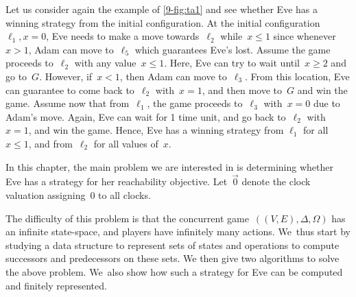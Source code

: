 \begin{example}
Let us consider again the example of \cref{9-fig:ta1} and see whether Eve
has a winning strategy from the initial configuration.
At the initial configuration~$\ell_1,x=0$, Eve needs to make a move towards~$\ell_2$
while~$x\leq 1$ since whenever~$x>1$, Adam can move to~$\ell_5$ which guarantees Eve's lost.
Assume the game proceeds to~$\ell_2$ with any value~$x\leq 1$. Here, Eve can try to wait
until~$x\geq 2$ and go to~$G$. However, if~$x<1$, then Adam can move to~$\ell_3$.
From this location, Eve can guarantee to come back to~$\ell_2$ with~$x=1$, and then move to~$G$ and win the game.
Assume now that from~$\ell_1$, the game proceeds to~$\ell_3$ with~$x=0$ due to Adam's move.
Again, Eve can wait for 1 time unit, and go back to~$\ell_2$ with~$x=1$, and win the game.
%
Hence, Eve has a winning strategy from $\ell_1$ for all~$x\leq 1$, and from~$\ell_2$
for all values of~$x$.
\end{example}


In this chapter, the main problem we are interested in is determining
whether Eve has a strategy for her reachability objective.
Let~$\vec{0}$ denote the clock valuation assigning~$0$ to all clocks.


The difficulty of this problem is that the concurrent
game~$((V,E),\Delta,\Omega)$ has an infinite state-space, and players
have infinitely many actions.  We~thus start by studying a data
structure to represent sets of states and operations to compute
successors and predecessors on these sets.  We then give two
algorithms to solve the above problem.  We~also show how such a
strategy for Eve can be computed and finitely represented.
